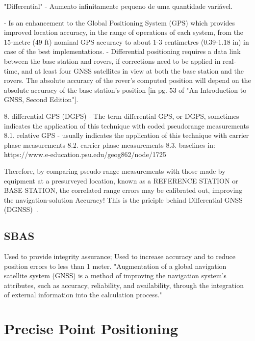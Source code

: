 "Differential" - Aumento infinitamente pequeno de uma quantidade variável.

- Is an enhancement to the Global Positioning System (GPS) which provides improved location accuracy, in the range of operations of each system, from the 15-metre (49 ft) nominal GPS accuracy to about 1-3 centimetres (0.39-1.18 in) in case of the best implementations.
- Differential positioning requires a data link between the base station and rovers, if corrections need to be applied in real-time, and at least four GNSS satellites in view at both the base station and the rovers. The absolute accuracy of the rover's computed position will depend on the absolute accuracy of the base station's position [in pg. 53 of "An Introduction to GNSS, Second Edition"].

8. differential GPS (DGPS) - The term differential GPS, or DGPS, sometimes indicates the application of this technique with coded pseudorange measurements
8.1. relative GPS - usually indicates the application of this technique with carrier phase measurements
8.2. carrier phase measurements
8.3. baselines
in: https://www.e-education.psu.edu/geog862/node/1725

Therefore, by comparing pseudo-range measurements with those made by equipment at a presurveyed location, known as a REFERENCE STATION or BASE STATION, the correlated range errors may be calibrated out, improving the navigation-solution Accuracy! This is the priciple behind Differential GNSS (DGNSS)~\cite{edseee_9101092}. %

\subsection{SBAS}\label{sec:II_gnss_sbas}

Used to provide integrity assurance;
Used to increase accuracy and to reduce position errors to less than 1 meter.
"Augmentation of a global navigation satellite system (GNSS) is a method of improving the navigation system's attributes, such as accuracy, reliability, and availability, through the integration of external information into the calculation process."

\section{Precise Point Positioning}\label{sec:II_ppp}

